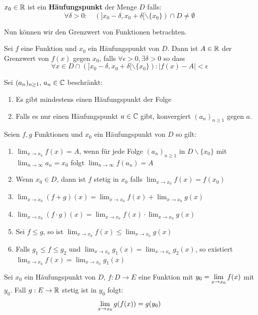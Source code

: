 \begin{tcolorbox}
    $x_0 \in \mathbb{R}$ ist ein \textbf{Häufungspunkt} der Menge $D$ falls:
    $$\forall \delta > 0 : \quad (]x_0 - \delta, x_0 + \delta [ \backslash \{ x_0 \}) \cap D \neq \emptyset$$
\end{tcolorbox}

Nun können wir den Grenzwert von Funktionen betrachten.

\begin{tcolorbox}
    Sei $f$ eine Funktion und $x_0$ ein Häufungspunkt von $D$. Dann ist $A \in \mathbb{R}$ der Grenzwert
    von $f(x)$ gegen $x_0$, falls $\forall \epsilon > 0, \exists \delta > 0$ so dass
    $$\forall x \in D \cap (]x_0 - \delta, x_0 + \delta [ \backslash \{ x_0 \}) : |f(x) - A| < \epsilon$$
\end{tcolorbox}

\Satz Sei $(a_n)_{n \geq 1}, \, a_n \in \mathbb{C}$ beschränkt:
\begin{enumerate}[label=(\arabic*)]
    \item{Es gibt mindestens einen Häufungspunkt der Folge}
    \item{Falls es nur einen Häufungspunkt \(a\in\mathbb{C}\) gibt, konvergiert \((a_n)_{n \geq 1}\) gegen \(a\).}
\end{enumerate}

\Bem Seien $f,g$ Funktionen und $x_0$ ein Häufungspunkt von $D$ so gilt:
\begin{enumerate}[label = (\arabic*)]
    \item $\lim_{x \to x_0} f(x) = A$, wenn für jede Folge $(a_n)_{n \geq 1}$ in $D \backslash \{ x_0 \}$
    mit $\lim_{n \to \infty} a_n = x_0$ folgt $\lim_{n \to \infty} f(a_n) = A$
    \item  Wenn $x_0 \in D$, dann ist $f$ stetig in $x_0$ falls $\lim_{x \to x_0} f(x) = f(x_0)$
    \item $\lim_{x \to x_0} (f + g)(x) = \lim_{x \to x_0} f(x) + \lim_{x \to x_0} g(x)$
    \item $\lim_{x \to x_0} (f \cdot g)(x) = \lim_{x \to x_0} f(x) \cdot \lim_{x \to x_0} g(x)$
    \item Sei $f \leq g$, so ist $\lim_{x \to x_0} f(x) \leq \lim_{x \to x_0} g(x)$
    \item Falls $g_1 \leq f \leq g_2$ und $\lim_{x \to x_0} g_1(x) = \lim_{x \to x_0} g_2(x)$, so
    existiert $\lim_{x \to x_0} f(x) = \lim_{x \to x_0} g_1(x)$
\end{enumerate}

\Satz Sei $x_0$ ein Häufungspunkt von $D$, $f : D \to E$ eine Funktion mit $y_0 = \lim\limits_{x \to x_0} f(x)$
mit $y_0$. Fall $g : E \to \mathbb{R}$ stetig ist in $y_0$ folgt:
$$\lim\limits_{x \to x_0} g(f(x)) = g(y_0)$$


